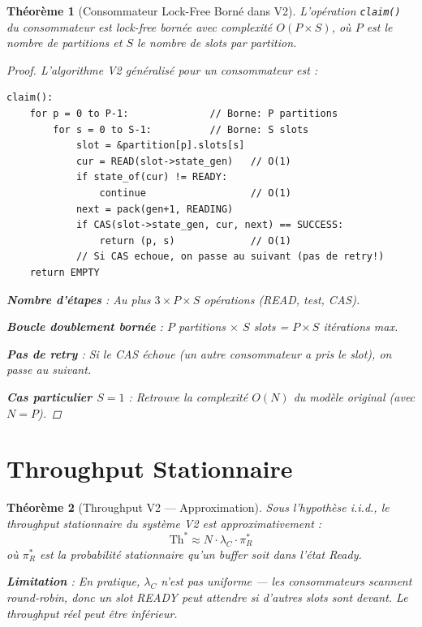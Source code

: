 \documentclass[11pt,a4paper]{article}
\theoremstyle{plain}
\newtheorem{theorem}{Théorème}[section]
\theoremstyle{definition}
\theoremstyle{remark}
\begin{document}
\begin{theorem}[Consommateur Lock-Free Borné dans V2]\label{thm:consumer_wait_free}
L'opération \texttt{claim()} du consommateur est lock-free bornée avec complexité $O(P \times S)$, où $P$ est le nombre de partitions et $S$ le nombre de slots par partition.

\begin{proof}
L'algorithme V2 généralisé pour un consommateur est :
\begin{lstlisting}
claim():
    for p = 0 to P-1:              // Borne: P partitions
        for s = 0 to S-1:          // Borne: S slots
            slot = &partition[p].slots[s]
            cur = READ(slot->state_gen)   // O(1)
            if state_of(cur) != READY:
                continue                  // O(1)
            next = pack(gen+1, READING)
            if CAS(slot->state_gen, cur, next) == SUCCESS:
                return (p, s)             // O(1)
            // Si CAS echoue, on passe au suivant (pas de retry!)
    return EMPTY
\end{lstlisting}

\textbf{Nombre d'étapes} : Au plus $3 \times P \times S$ opérations (READ, test, CAS).

\textbf{Boucle doublement bornée} : $P$ partitions $\times$ $S$ slots = $P \times S$ itérations max.

\textbf{Pas de retry} : Si le CAS échoue (un autre consommateur a pris le slot), on passe au suivant.

\textbf{Cas particulier $S=1$} : Retrouve la complexité $O(N)$ du modèle original (avec $N = P$).
\end{proof}
\end{theorem}

\section{Throughput Stationnaire}

\begin{theorem}[Throughput V2 --- Approximation]\label{thm:throughput_v2}
Sous l'hypothèse i.i.d., le throughput stationnaire du système V2 est approximativement :
\[
\boxed{\mathrm{Th}^* \approx N \cdot \lambda_C \cdot \pi_R^*}
\]
où $\pi_R^*$ est la probabilité stationnaire qu'un buffer soit dans l'état Ready.

\textbf{Limitation} : En pratique, $\lambda_C$ n'est pas uniforme --- les consommateurs scannent round-robin, donc un slot READY peut attendre si d'autres slots sont devant. Le throughput réel peut être inférieur.
\end{theorem}
\end{document}
